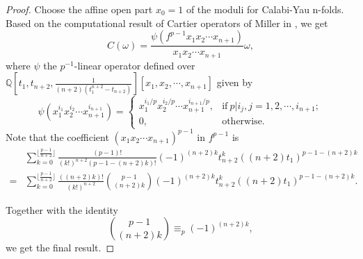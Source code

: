\documentclass[11pt,leqno]{article}
\newtheorem{prop}{Proposition}
\theoremstyle{remark}
\theoremstyle{definition}
\begin{document}
\begin{proof}
Choose the affine open part $x_0 = 1$ of the moduli for Calabi-Yau n-folds. Based on the computational result of Cartier operators of Miller in \cite[Corollary 1]{Miller72}, we get
\begin{equation}
C(\omega) = \frac{\psi(f^{p-1}x_1x_2\cdots x_{n+1})}{x_1x_2\cdots x_{n+1}} \omega,
\end{equation}
where $\psi$ the $p^{-1}$-linear operator defined over $\mathbb{Q}[t_1, t_{n+2}, \frac{1}{(n+2)(t_1^{n+2}-t_{n+2})}][x_1,x_2,\cdots,x_{n+1}]$ given by
\[
\psi(x_1^{i_1}x_2^{i_2}\cdots x_{n+1}^{i_{n+1}}) = \begin{cases}
x_1^{i_1/p}x_2^{i_2/p}\cdots x_{n+1}^{i_{n+1}/p}, & \mathrm{if} \ p|i_j, j=1,2,\cdots, i_{n+1}; \\
0, & \mathrm{otherwise}.
\end{cases}
\]
Note that the coefficient $(x_1x_2\cdots x_{n+1})^{p-1}$ in $f^{p-1}$ is
\begin{equation}
    \begin{split}
  &\sum_{k=0}^{\lfloor \frac{p-1}{n+2} \rfloor}\frac{(p-1)!}{(k!)^{n+2}(p-1-(n+2)k)!} (-1)^{(n+2)k}t_{n+2}^k ((n+2)t_1)^{p-1-(n+2)k} \\
  =& \sum_{k=0}^{\lfloor \frac{p-1}{n+2} \rfloor}\frac{((n+2)k)!}{(k!)^{n+2}}
\binom{p-1}{(n+2)k} (-1)^{(n+2)k} t_{n+2}^k ((n+2)t_1)^{p-1-(n+2)k}.      
    \end{split}
\end{equation}

Together with the identity 
$$
\binom{p-1}{(n+2)k}\equiv_p (-1)^{(n+2)k},
$$
we get the final result.
\end{proof}
\end{document}
